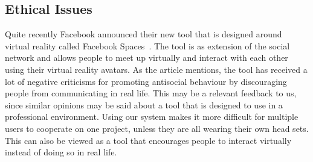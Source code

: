     \subsection{Ethical Issues}
        Quite recently Facebook announced their new tool that is designed around virtual reality called Facebook Spaces~\cite{facebook2017}. The tool is as extension of the social network and allows people to meet up virtually and interact with each other using their virtual reality avatars. As the article mentions, the tool has received a lot of negative criticisms for promoting antisocial behaviour by discouraging people from communicating in real life. This may be a relevant feedback to us, since similar opinions may be said about a tool that is designed to use in a professional environment. Using our system makes it more difficult for multiple users to cooperate on one project, unless they are all wearing their own head sets. This can also be viewed as a tool that encourages people to interact virtually instead of doing so in real life.